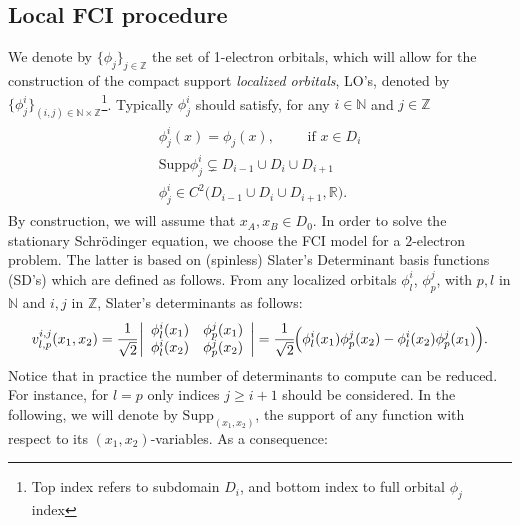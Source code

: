 \documentclass[11pt]{elsarticle}
\let \geq \geqslant
\newcommand{\R} {\ensuremath{\mathbb{R}}}
\newcommand{\Z} {\ensuremath{\mathbb{Z}}}
\newcommand{\N} {\ensuremath{\mathbb{N}}}
\begin{document}
\subsection{Local FCI procedure}
We denote by $\big\{\phi_j\big\}_{j\in \Z}$ the set of 1-electron orbitals, which will allow for the construction of the compact support {\it localized orbitals}, LO's, denoted by $\big\{\phi_j^{i}\big\}_{(i,j)\in \N\times \Z}$\footnote{Top index refers to subdomain $D_i$, and bottom index to full orbital $\phi_j$ index}. Typically $\phi_j^i$ should satisfy, for any $i \in \N$ and $j \in \Z$
\begin{eqnarray}\label{phi_ij}
\left.
\begin{array}{l}
\phi^i_{j}(x) = \phi_j(x), \qquad \mbox{ if } x \in D_i\\
\mbox{Supp}\phi_j^i \subsetneq D_{i-1}\cup D_i\cup D_{i+1}\\
\phi_j^i \in C^2\big(D_{i-1}\cup D_i\cup D_{i+1},\R\big).
\end{array}
\right.
\end{eqnarray}
By construction, we will assume that $x_A,x_B \in D_0$. In order to solve the stationary Schr\"odinger equation, we choose the FCI model for a $2$-electron problem. The latter is based on (spinless) Slater's Determinant basis functions (SD's) which are defined as follows. 
From any localized orbitals $\phi^i_l$, $\phi_p^j$, with $p,l$ in $\N$ and $i,j$ in $\Z$, Slater's determinants as follows:
\begin{eqnarray}\label{LSD}
v_{l,p}^{i,j}(x_1,x_2) = 
\cfrac{1}{\sqrt{2}}\left|
\begin{array}{cc}
\phi^i_l(x_1) & \phi^j_p(x_1) \\
\phi^i_l(x_2) & \phi^j_p(x_2) 
\end{array}
\right| = \cfrac{1}{\sqrt{2}}\Big(\phi_l^i(x_1)\phi_p^j(x_2) -\phi_l^i(x_2)\phi_p^j(x_1)\Big).
\end{eqnarray}
Notice that in practice the number of determinants to compute can be reduced. For instance, for $l=p$ only indices $j\geq i+1$ should be considered. In the following, we will denote by $\mbox{Supp}_{(x_1,x_2)}$, the support of any function with respect to its $(x_1,x_2)$-variables. As a consequence:
\end{document}
